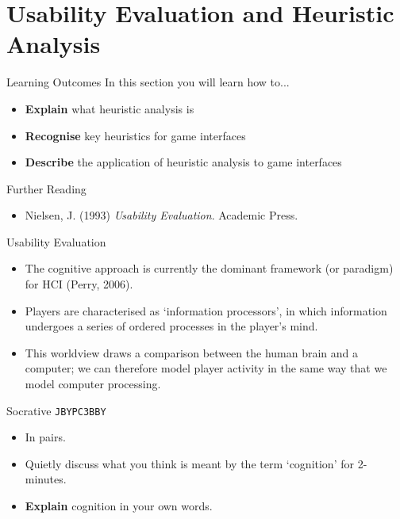 \part{Usability Evaluation and Heuristic Analysis}
\frame{\partpage}

\begin{frame}{Learning Outcomes}
	In this section you will learn how to...
	
	\begin{itemize}
		\item \textbf{Explain} what heuristic analysis is
		\item \textbf{Recognise} key heuristics for game interfaces
		\item \textbf{Describe} the application of heuristic analysis to game interfaces
	\end{itemize}
\end{frame}

\begin{frame}{Further Reading}
	\begin{itemize}
		\item Nielsen, J. (1993) \textit{Usability Evaluation}. Academic Press.
	\end{itemize}
\end{frame}

\begin{frame}{Usability Evaluation}
	\begin{itemize}
		\item The cognitive approach is currently the dominant framework (or paradigm) for HCI (Perry, 2006).
		\item Players are characterised as `information processors', in which information undergoes a series of ordered processes
		in the player's mind.
		\item This worldview draws a comparison between the human brain and a computer; we can therefore model player activity in the same
		way that we model computer processing.
	\end{itemize}
\end{frame}

\begin{frame}[fragile]{Socrative \texttt{JBYPC3BBY}}
	\begin{itemize}
		\item In pairs.
		\item Quietly discuss what you think is meant by the term `cognition' for 2-minutes.
		\item \textbf{Explain} cognition in your own words.
	\end{itemize}
\end{frame}


